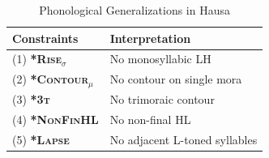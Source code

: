 	\begin{table}[h]
		\begin{tabular}{ll}
			\hline
\textbf{Constraints}               & \textbf{Interpretation}     \\ \hline
			(1)			\textbf{\textsc{*Rise$_\sigma$}}   & No monosyllabic LH \\
(2)			\textbf{\textsc{*Contour$_{\mu}$}} & No contour on single mora\\
(3)			\textbf{\textsc{*3t}}              & No trimoraic contour        \\
(4)			\textbf{\textsc{*NonFinHL}}         & No non-final HL              \\
(5)			\textbf{\textsc{*Lapse}}           & No adjacent L-toned syllables       \\ \hline
		\end{tabular}
		\caption{Phonological Generalizations in Hausa}
		\label{rules}
	\end{table}
%
